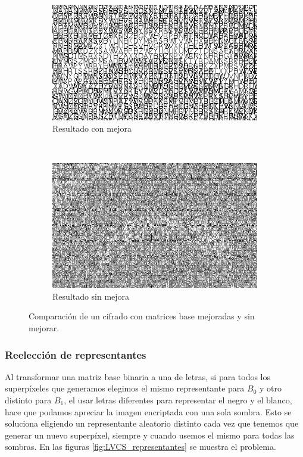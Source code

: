 \begin{figure}[hp]
	\centering
	\begin{subfigure}[t]{0.9\textwidth}
		\centering
		\includegraphics[width=\textwidth]{images/matriz_mejorada}
		\caption{Resultado con mejora}
	\end{subfigure}
	\\[0.5cm]
	\begin{subfigure}[t]{0.9\textwidth}
		\centering
		\includegraphics[width=\textwidth]{images/matriz_sin_mejora}
		\caption{Resultado sin mejora}
	\end{subfigure}
	\caption{Comparación de un cifrado con matrices base mejoradas y sin
	mejorar.}
	\label{fig:LVCS_comparacion}
\end{figure}

\subsubsection{Reelección de representantes}
Al transformar una matriz base binaria a una de letras, si para todos los
superpíxeles que generamos elegimos el mismo representante para $B_0$ y otro
distinto para $B_1$, el usar letras diferentes para representar el negro y el
blanco, hace que podamos apreciar la imagen encriptada con una sola sombra. Esto
se soluciona eligiendo un representante aleatorio distinto cada vez que tenemos
que generar un nuevo superpíxel, siempre y cuando usemos el mismo para todas las
sombras. En las figuras \ref{fig:LVCS_representantes} se muestra el problema.

